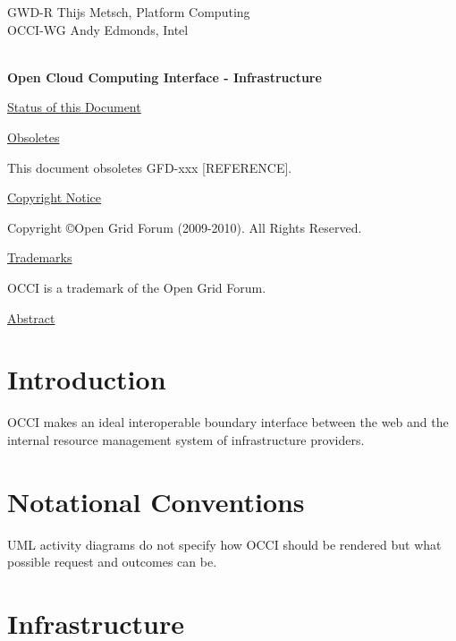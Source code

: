 \documentclass[10pt,a4paper]{article}
\begin{document}
\thispagestyle{empty}

GWD-R \hfill  Thijs Metsch, Platform Computing\\
OCCI-WG \hfill  Andy Edmonds, Intel\\
\\

\vspace*{0.5in}

\begin{Large}
\textbf{Open Cloud Computing Interface - Infrastructure}
\end{Large}

\vspace*{0.5in}

\underline{Status of this Document}



\underline{Obsoletes}

This document obsoletes GFD-xxx [REFERENCE].

\underline{Copyright Notice}

Copyright \copyright Open Grid Forum (2009-2010). All Rights Reserved.

\underline{Trademarks}

OCCI is a trademark of the Open Grid Forum.

\underline{Abstract}



\newpage
\tableofcontents
\newpage

\section{Introduction}


OCCI makes an ideal interoperable boundary interface between the web and the
internal resource management system of infrastructure providers.

\section{Notational Conventions}


UML activity diagrams do not specify how OCCI should be rendered but what
possible request and outcomes can be.


\section{Infrastructure}
\end{document}
